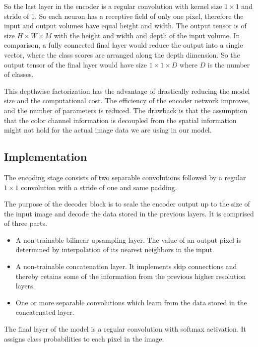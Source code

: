 \documentclass[11pt, onecolumn, oneside, reqno]{article}
\begin{document}
So the last layer in the encoder is a regular convolution with kernel size $1 \times 1$ and stride of $1$. So each neuron has a receptive field of only one pixel, therefore the input and output volumes have equal height and width. The output tensor is of size $H \times W \times M$ with the height and width and depth of the input volume. In comparison, a fully connected final layer would reduce the output into a single vector, where the class scores are arranged along the depth dimension. So the output tensor of the final layer would have size $1 \times 1 \times D$ where $D$ is the number of classes.

This depthwise factorization has the advantage of drastically reducing the model size and the computational cost. The efficiency of the encoder network improves, and the number of parameters is reduced. The drawback is that the assumption that the color channel information is decoupled from the spatial information might not hold for the actual image data we are using in our model.

\subsection{Implementation}
The encoding stage consists of two separable convolutions followed by a regular $1 \times 1$ convolution with a stride of one and same padding.

The purpose of the decoder block is to scale the encoder output up to the size of the input image and decode the data stored in the previous layers. It is comprised of three parts.
\begin{itemize}
\item A non-trainable bilinear upsampling layer. The value of an output pixel is determined by interpolation of its nearest neighbors in the input.
\item A non-trainable concatenation layer. It implements skip connections and thereby retains some of the information from the previous higher resolution layers.
\item One or more separable convolutions which learn from the data stored in the concatenated layer.
\end{itemize}

The final layer of the model is a regular convolution with softmax activation. It assigns class probabilities to each pixel in the image.
\end{document}
